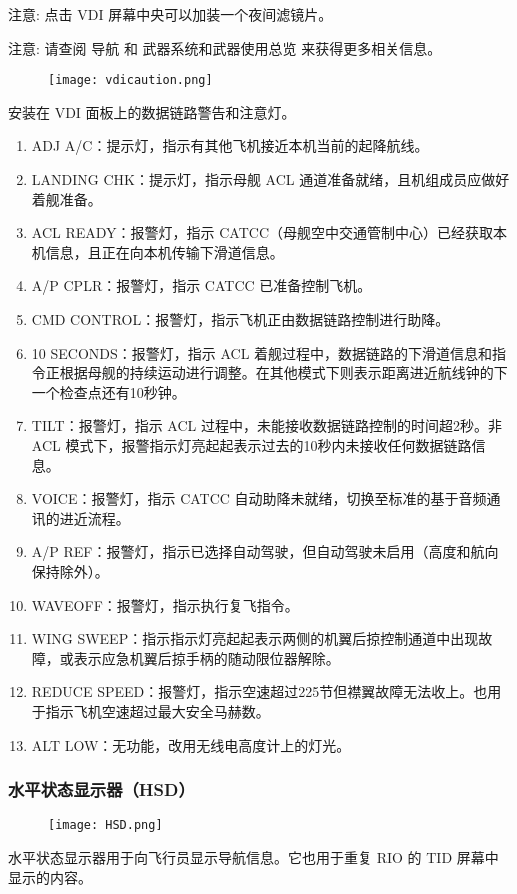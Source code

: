 注意:	点击 VDI 屏幕中央可以加装一个夜间滤镜片。

注意:	请查阅 导航 和 武器系统和武器使用总览 来获得更多相关信息。

\begin{figure}[htb]
  \center
  \texttt{[image: vdicaution.png]}
\end{figure}
安装在 VDI 面板上的数据链路警告和注意灯。

\begin{enumerate}
  \item ADJ A/C：提示灯，指示有其他飞机接近本机当前的起降航线。
  \item LANDING CHK：提示灯，指示母舰 ACL 通道准备就绪，且机组成员应做好着舰准备。
  \item ACL READY：报警灯，指示 CATCC（母舰空中交通管制中心）已经获取本机信息，且正在向本机传输下滑道信息。
  \item A/P CPLR：报警灯，指示 CATCC 已准备控制飞机。
  \item CMD CONTROL：报警灯，指示飞机正由数据链路控制进行助降。
  \item 10 SECONDS：报警灯，指示 ACL 着舰过程中，数据链路的下滑道信息和指令正根据母舰的持续运动进行调整。在其他模式下则表示距离进近航线钟的下一个检查点还有10秒钟。
  \item TILT：报警灯，指示 ACL 过程中，未能接收数据链路控制的时间超2秒。非 ACL 模式下，报警指示灯亮起起表示过去的10秒内未接收任何数据链路信息。
  \item VOICE：报警灯，指示 CATCC 自动助降未就绪，切换至标准的基于音频通讯的进近流程。
  \item A/P REF：报警灯，指示已选择自动驾驶，但自动驾驶未启用（高度和航向保持除外）。
  \item WAVEOFF：报警灯，指示执行复飞指令。
  \item WING SWEEP：指示指示灯亮起起表示两侧的机翼后掠控制通道中出现故障，或表示应急机翼后掠手柄的随动限位器解除。
  \item REDUCE SPEED：报警灯，指示空速超过225节但襟翼故障无法收上。也用于指示飞机空速超过最大安全马赫数。
  \item ALT LOW：无功能，改用无线电高度计上的灯光。
\end{enumerate}

\subsubsection{水平状态显示器（HSD）}

\begin{figure}[htb]
  \center
  \texttt{[image: HSD.png]}
\end{figure}
水平状态显示器用于向飞行员显示导航信息。它也用于重复 RIO 的 TID 屏幕中显示的内容。

